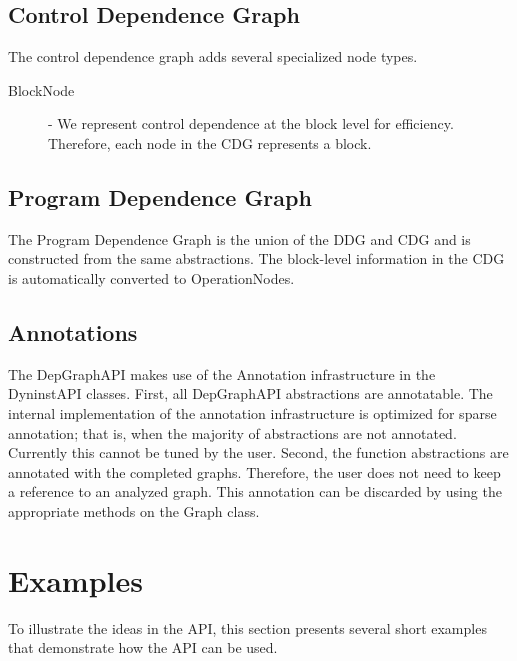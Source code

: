 \documentclass[12pt,titlepage]{article}
\begin{document}
\subsection{Control Dependence Graph}

The control dependence graph adds several specialized node types.

\begin{description}
\item[BlockNode] - We represent
control dependence at the block level for efficiency. Therefore, each
node in the CDG represents a block. 
\end{description}

\subsection{Program Dependence Graph}
The Program Dependence Graph is the union of the DDG and CDG and is
constructed from the same abstractions. The block-level information in
the CDG is automatically converted to OperationNodes.

\subsection{Annotations} 

The DepGraphAPI makes use of the Annotation infrastructure in the
DyninstAPI classes. First, all DepGraphAPI abstractions are
annotatable. The internal implementation of the annotation
infrastructure is optimized for sparse annotation; that is, when the
majority of abstractions are not annotated. Currently this cannot be
tuned by the user. Second, the function abstractions are annotated
with the completed graphs. Therefore, the user does not need to keep a
reference to an analyzed graph. This annotation can be discarded by
using the appropriate methods on the Graph class.

\section{Examples} 

To illustrate the ideas in the API, this section presents several
short examples that demonstrate how the API can be used.  
\end{document}
